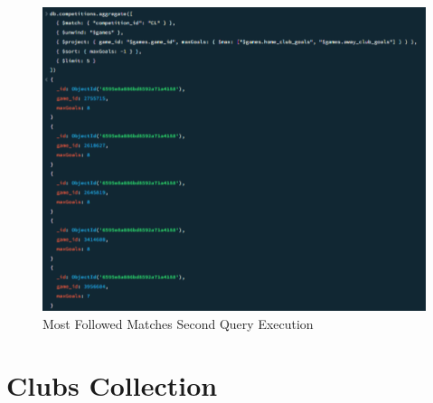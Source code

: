 \documentclass{Configuration_Files/PoliMi3i_thesis}
\begin{document}
\begin{figure}[htbp]
    \centering
    \includegraphics[scale=0.9]{Images/Queries/Competitions/most_goal_single_teams/mgstcl.png}
    \caption{Most Followed Matches Second Query Execution}
\end{figure}
\newpage
\section{Clubs Collection}
\end{document}
